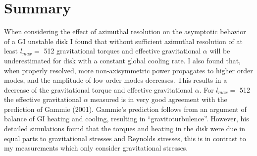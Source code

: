 \documentclass[manuscript]{aastex} %
\begin{document}
\section{Summary}

When considering the effect of azimuthal resolution on the asymptotic behavior
of a GI unstable disk I found that without sufficient azimuthal resolution of at least
$l_{max} =$ 512 gravitational torques and effective gravitational $\alpha$
will be underestimated
for disk with a constant global cooling rate. I also found that, when properly resolved,
more non-axisymmetric power propagates to higher order modes, and the amplitude
of low-order modes decreases. This results in a decrease of the gravitational torque
and effective gravitational $\alpha$. For $l_{max} =$ 512 the effective gravitational 
$\alpha$ measured
is in very good agreement with the prediction of Gammie (2001). Gammie's 
prediction follows from an argument of balance of GI heating and cooling, resulting in
``gravitoturbulence''. However, his detailed simulations found that the torques and
heating in the disk were due in equal parts to gravitational stresses and Reynolds
stresses, this is in contrast to my measurements which only consider gravitational
stresses.


\acknowledgements





\newpage



\end{document}
